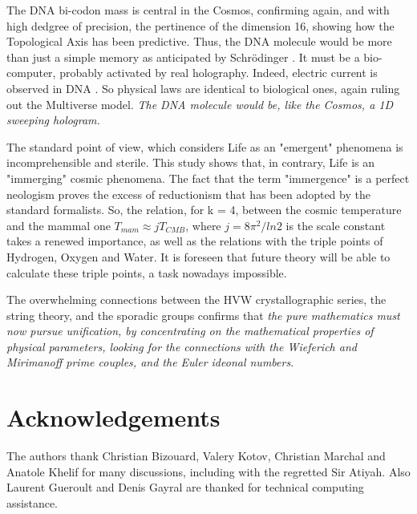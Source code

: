 \documentclass[a4paper,9pt]{article}
\begin{document}
The DNA bi-codon mass is central in the Cosmos, confirming again, and with high dedgree of precision, the pertinence of the dimension 16, showing how the Topological Axis has been predictive. Thus, the DNA molecule would be more than just a simple memory as anticipated by Schrödinger \cite{Schrodinger}. It must be a bio-computer, probably activated by real holography. Indeed, electric current is observed in DNA \cite{Montagnier}. So physical laws are identical to biological ones, again ruling out the Multiverse model. \textit {The DNA molecule would be, like the Cosmos, a 1D sweeping hologram.}

The standard point of view, which considers Life as an "emergent" phenomena is incomprehensible and sterile. This study shows that, in contrary, Life is an "immerging" cosmic phenomena. The fact that the term "immergence" is a perfect neologism proves the excess of reductionism that has been adopted by the standard formalists. So, the relation, for k = 4, between the cosmic temperature and the mammal one $T_{mam}\approx jT_{CMB}$, where $j =  8 \pi^2/ln2$ is the scale constant \cite {Sanchez2} takes a renewed importance, as well as the relations with the triple points of Hydrogen, Oxygen and Water. It is foreseen that future theory will be able to calculate these triple points, a task nowadays impossible.

The overwhelming connections between the HVW crystallographic series, the string theory, and the sporadic groups confirms that \textit{the pure mathematics must now pursue unification, by concentrating on the mathematical properties of physical parameters, looking for the connections with the Wieferich and Mirimanoff prime couples, and the Euler ideonal numbers}.


 
 \section {Acknowledgements}

The authors thank Christian Bizouard, Valery Kotov, Christian Marchal and Anatole Khelif for many discussions, including with the regretted Sir Atiyah. Also Laurent Gueroult and Denis Gayral are thanked for technical computing assistance.

\end{document}
